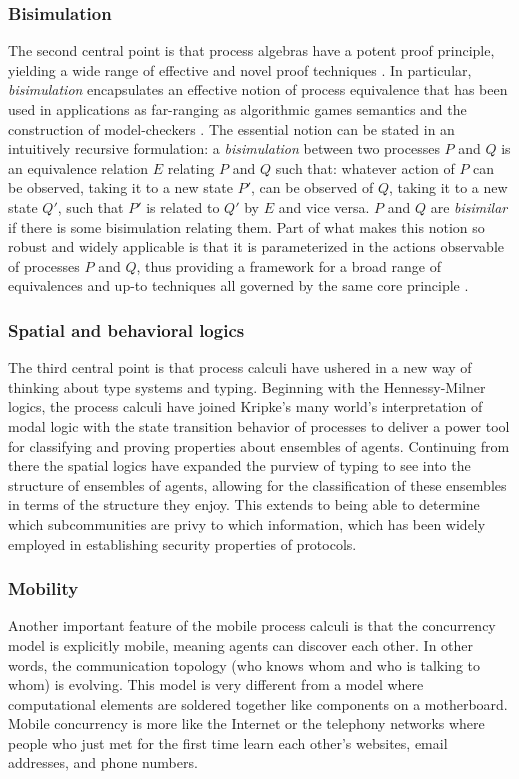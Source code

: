 \subsubsection{Bisimulation} The second central point is that process algebras have a potent proof
principle, yielding a wide range of effective and novel proof
techniques \cite{DBLP:conf/concur/SangiorgiM92} \cite{DBLP:conf/fmco/Sangiorgi05} \cite{DBLP:journals/toplas/Sangiorgi09}. In particular, \emph{bisimulation} encapsulates an effective
notion of process equivalence that has been used in applications as
far-ranging as algorithmic games semantics
\cite{DBLP:conf/sas/Abramsky05} and the construction of
model-checkers \cite{caires_2004}. The essential notion can be stated in
an intuitively recursive formulation: a \emph{bisimulation} between two
processes $P$ and $Q$ is an equivalence relation $E$ relating $P$
and $Q$ such that: whatever action of $P$ can be observed, taking it
to a new state $P'$, can be observed of $Q$, taking it to a new state
$Q'$, such that $P'$ is related to $Q'$ by $E$ and vice versa. $P$ and
$Q$ are \emph{bisimilar} if there is some bisimulation relating
them. Part of what makes this notion so robust and widely applicable
is that it is parameterized in the actions observable of processes
$P$ and $Q$, thus providing a framework for a broad range of
equivalences and up-to techniques \cite{DBLP:conf/concur/SangiorgiM92} all governed by the same core
principle \cite{DBLP:journals/toplas/Sangiorgi09}.

\subsubsection{Spatial and behavioral logics} The third central point is that process calculi have ushered in a new way of thinking about type systems and typing. Beginning with the Hennessy-Milner logics, the process calculi have joined Kripke's many world's interpretation of modal logic with the state transition behavior of processes to deliver a power tool for classifying and proving properties about ensembles of agents. Continuing from there the spatial logics have expanded the purview of typing to see into the structure of ensembles of agents, allowing for the classification of these ensembles in terms of the structure they enjoy. This extends to being able to determine which subcommunities are privy to which information, which has been widely employed in establishing security properties of protocols.

\subsubsection{Mobility} Another important feature of the mobile process calculi is that the
concurrency model is explicitly mobile, meaning agents can discover
each other. In other words, the communication topology (who knows whom
and who is talking to whom) is evolving. This model is very different
from a model where computational elements are soldered together like
components on a motherboard. Mobile concurrency is more like the
Internet or the telephony networks where people who just met for the
first time learn each other’s websites, email addresses, and phone
numbers.

